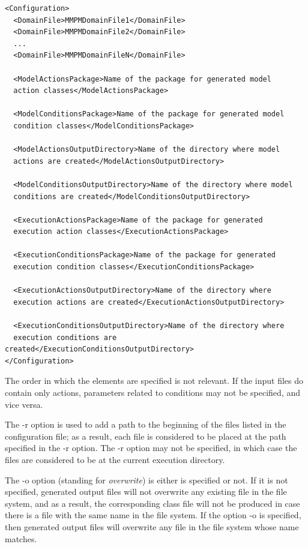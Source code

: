 \documentclass[a4paper]{article}
\begin{document}
\begin{verbatim}
<Configuration>
  <DomainFile>MMPMDomainFile1</DomainFile>
  <DomainFile>MMPMDomainFile2</DomainFile>
  ...
  <DomainFile>MMPMDomainFileN</DomainFile>
  
  <ModelActionsPackage>Name of the package for generated model
  action classes</ModelActionsPackage>
  
  <ModelConditionsPackage>Name of the package for generated model 
  condition classes</ModelConditionsPackage>
  
  <ModelActionsOutputDirectory>Name of the directory where model 
  actions are created</ModelActionsOutputDirectory>
  
  <ModelConditionsOutputDirectory>Name of the directory where model 
  conditions are created</ModelConditionsOutputDirectory>
  
  <ExecutionActionsPackage>Name of the package for generated 
  execution action classes</ExecutionActionsPackage>
  
  <ExecutionConditionsPackage>Name of the package for generated
  execution condition classes</ExecutionConditionsPackage>
  
  <ExecutionActionsOutputDirectory>Name of the directory where 
  execution actions are created</ExecutionActionsOutputDirectory>
  
  <ExecutionConditionsOutputDirectory>Name of the directory where 
  execution conditions are created</ExecutionConditionsOutputDirectory>
</Configuration>
\end{verbatim}

The order in which the elements are specified is not relevant. If the input files do contain only actions, parameters related to conditions may not be specified, and vice versa.

The -r option is used to add a path to the beginning of the files listed in the configuration file; as a result, each file is considered to be placed at the path specified in the -r option. The -r option may not be specified, in which case the files are considered to be at the current execution directory.

The -o option (standing for \textit{overwrite}) is either is specified or not. If it is not specified, generated output files will not overwrite any existing file in the file system, and as a result, the corresponding class file will not be produced in case there is a file with the same name in the file system. If the option -o is specified, then generated output files will overwrite any file in the file system whose name matches.
\end{document}
